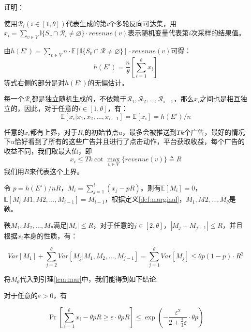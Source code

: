 \noindent 证明：

使用$\mathcal{R}_i(i\in[1,\theta])$代表生成的第$i$个多轮反向可达集，用$x_i=\sum_{v\in V}\mathbb{I}\{S_v\cap\mathcal{R}_i\ne \varnothing  \}\cdot revenue(v)$表示随机变量代表第$i$次采样的结果值。

由$h(E')=\sum_{v \in V} n\cdot\mathbb{E}[\mathbb{I}\{S_v\cap \mathcal{R}\ne \varnothing \}]\cdot revenue(v)$可得：
\begin{equation}
h(E')=\frac{n}{\theta}\left[\sum_{i=1}^{\theta}x_i\right]
\end{equation}
\noindent 等式右侧的部分是对$h(E')$的无偏估计。

每一个$\mathcal{R}_i$都是独立随机生成的，不依赖于$\mathcal{R}_1,\mathcal{R}_2,\ldots,\mathcal{R}_{i-1}$，那么$x_i$之间也是相互独立的，因此，对于任意的$i\in[1,\theta]$，有：
\begin{equation}
\mathbb{E}[x_i|x_1,x_2,\ldots,x_{i-1}]=\mathbb{E}[x_i]=h(E')/n
\end{equation}

任意的$x_i$都有上界，对于$R_i$的初始节点$u$，最多会被推送到$Tk$个广告，最好的情况下$u$恰好看到了所有的这些广告并且进行了点击动作，平台获取收益，每个广告的收益不同，我们取最大值，即
\begin{equation}
x_i\le Tk\cot \max_{v\in V}\{revenue(v)\}\triangleq R
\end{equation}
\noindent 我们用$R$来代表这个上界。

令 $p=h(E')/nR$，$M_i=\sum_{j=1}^{i}(x_j-pR)$。则有$\mathbb{E}[M_i]=0$，$\mathbb{E}[M_i|M1,M2,\ldots,M_{i-1}]=M_{i-1}$，根据定义\ref{def:marginal}，$M_1,M2,\ldots,M_\theta$是鞅。

鞅$M_1,M_2,\ldots,M_\theta$满足$|M_i|\le R$，对于任意的$j\in [2,\theta]$，$|M_j-M_{j-1}|\le R$，并且根据$x_i$本身的性质，有：

\begin{equation}
    Var[M_1]+\sum_{j=2}^{\theta}Var[M_j|M_1,M_2,\ldots,M_{j-1}]=\sum_{j=1}^{\theta}Var[M_j] \le \theta p(1-p)\cdot R^2
\end{equation}

将$M_\theta$代入到引理\ref{lem:mar}中，我们能得到如下结论:

对于任意的$\varepsilon > 0$，有

\begin{equation}
\Pr\left[\sum_{i=1}^{\theta}x_i- \theta pR \ge \varepsilon \cdot \theta p R\right] \le \exp(-\frac{\varepsilon^2}{2+\frac{2}{3}\varepsilon}\cdot \theta p)
\end{equation}

